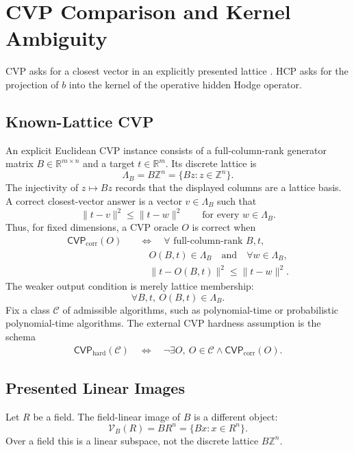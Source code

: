\section{CVP Comparison and Kernel Ambiguity}

CVP asks for a closest vector in an explicitly presented lattice
\cite{micciancioGoldwasser2002}. HCP asks for
the projection of \(b\) into the kernel of the operative hidden Hodge operator.

\subsection{Known-Lattice CVP}

An explicit Euclidean CVP instance consists of a full-column-rank generator
matrix \(B\in\mathbb R^{m\times n}\) and a target \(t\in\mathbb R^m\). Its
discrete lattice is
\[
  \Lambda_B=B\mathbb Z^n=\{Bz:z\in\mathbb Z^n\}.
\]
The injectivity of \(z\mapsto Bz\) records that the displayed columns are a
lattice basis. A correct closest-vector answer is a vector
\(v\in\Lambda_B\) such that
\[
  \|t-v\|^2\le \|t-w\|^2
  \qquad
  \text{for every }w\in\Lambda_B.
\]
Thus, for fixed dimensions, a CVP oracle \(O\) is correct when
\[
\begin{aligned}
  \mathsf{CVP}_{\mathrm{corr}}(O)
  &\quad\Longleftrightarrow\quad
  \forall\text{ full-column-rank }B,t,\\
  &\qquad O(B,t)\in\Lambda_B
  \quad\text{and}\quad
  \forall w\in\Lambda_B,\\
  &\qquad \|t-O(B,t)\|^2\le \|t-w\|^2.
\end{aligned}
\]
The weaker output condition is merely lattice membership:
\[
  \forall B,t,\ O(B,t)\in\Lambda_B .
\]
Fix a class \(\mathcal C\) of admissible algorithms, such as polynomial-time or
probabilistic polynomial-time algorithms. The external CVP hardness assumption
is the schema
\[
\begin{aligned}
  \mathsf{CVP}_{\mathrm{hard}}(\mathcal C)
  \quad\Longleftrightarrow\quad
  \neg\exists O,\ 
    O\in\mathcal C\wedge\mathsf{CVP}_{\mathrm{corr}}(O).
\end{aligned}
\]

\subsection{Presented Linear Images}

Let \(R\) be a field. The field-linear image of \(B\) is a different object:
\[
  \mathcal V_B(R)=BR^n=\{Bx:x\in R^n\}.
\]
Over a field this is a linear subspace, not the discrete lattice
\(B\mathbb Z^n\).

